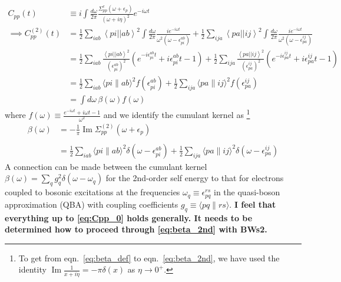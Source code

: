\begin{align}
C_{pp}(t) &\equiv i \int \frac{d\omega}{2\pi} \frac{ \Sigma_{pp}^c\left(\omega+\epsilon_p\right)}{(\omega + i \eta)^2} e^{-i \omega t} \\
\implies C_{pp}^{(2)}(t) &= \frac{1}{2} \sum_{iab} \left< pi \left| \right| ab \right>^2 \int \frac{d\omega}{2\pi} \frac{i e^{-i \omega t}}{\omega^2\left(\omega-\epsilon_{pi}^{ab}\right)} + \frac{1}{2} \sum_{ija} \left< pa \left| \right| ij \right>^2 \int \frac{d\omega}{2\pi} \frac{i e^{-i \omega t}}{\omega^2\left(\omega-\epsilon_{pa}^{ij}\right)} 
\label{eq:cumulant_2nd_1}
\\
&= \frac{1}{2}\sum_{iab} \frac{\left< pi \left| \right| ab \right>^2}{\left(\epsilon_{pi}^{ab}\right)^2}
\left(e^{-i \epsilon_{pi}^{ab} t} +i \epsilon_{pi}^{ab} t -1 \right)
+\frac{1}{2}\sum_{ija} \frac{\left< pa \left| \right| ij \right>^2}{\left(\epsilon_{pa}^{ij}\right)^2}
\left(e^{-i \epsilon_{pa}^{ij} t} +i \epsilon_{pa}^{ij} t -1 \right) 
\label{eq:cumulant_2nd}
\\
&= \frac{1}{2} \sum_{i a b}\langle p i \| a b\rangle^2 f\left(\epsilon_{p i}^{a b}\right)+\frac{1}{2} \sum_{i j a}\langle p a \| i j\rangle^2 f\left(\epsilon_{p a}^{i j}\right)\label{eq:cumulant_2nd_2}\\
&= \int d\omega\, \beta(\omega) f(\omega)
\end{align}
where $f(\omega) \equiv \frac{e^{-i \omega t}+i \omega t-1}{\omega^2} $ and we identify the cumulant kernel as
\footnote{To get from eqn.~\ref{eq:beta_def} to eqn.~\ref{eq:beta_2nd}, we have used the identity $\operatorname{Im} \frac{1}{x + i \eta} = -\pi \delta(x)$ as $\eta \to 0^+$.}
\begin{align}
    \beta(\omega) &= -\frac{1}{\pi} \operatorname{Im} \Sigma_{pp}^{(2)}\left(\omega+\epsilon_p\right) 
\label{eq:beta_def}\\
\\
&=\frac{1}{2} \sum_{i a b}\langle p i \| a b\rangle^2 \delta\left(\omega-\epsilon_{p i}^{a b}\right)+\frac{1}{2} \sum_{i j a}\langle p a \| i j\rangle^2 \delta\left(\omega-\epsilon_{p a}^{i j}\right) \label{eq:beta_2nd}
\end{align}
A connection can be made between the cumulant kernel $\beta(\omega)=\sum_q g_q^2 \delta(\omega-\omega_q)$ for the 2nd-order self energy  to that for electrons coupled to
bosonic excitations at the frequencies $\omega_q\equiv \epsilon_{pq}^{rs}$ in the quasi-boson approximation (QBA)
with coupling coefficients $g_q \equiv \langle p q \| r s\rangle$. \textbf{I feel that everything up to \ref{eq:Cpp_0} holds generally. It needs to be determined how to proceed through \ref{eq:beta_2nd} with BWs2.}
